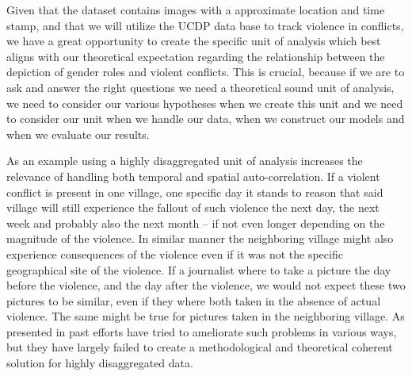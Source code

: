 \documentclass[a4paper]{article}
\begin{document}
Given that the dataset contains images with a approximate location and time stamp, and that we will utilize the UCDP data base to track violence in conflicts, we have a great opportunity to create the specific unit of analysis which best aligns with our theoretical expectation regarding the relationship between the depiction of gender roles and violent conflicts. This is crucial, because if we are to ask and answer the right questions we need a theoretical sound unit of analysis, we need to consider our various hypotheses when we create this unit and we need to consider our unit when we handle our data, when we construct our models and when we evaluate our results.\par 

As an example using a highly disaggregated unit of analysis increases the relevance of handling both temporal and spatial auto-correlation. If a violent conflict is present in one village, one specific day it stands to reason that said village will still experience the fallout of such violence the next day, the next week and probably also the next month -- if not even longer depending on the magnitude of the violence. In similar manner the neighboring village might also experience consequences of the violence even if it was not the specific geographical site of the violence. If a journalist where to take a picture the day before the violence, and the day after the violence, we would not expect these two pictures to be similar, even if they where both taken in the absence of actual violence. The same might be true for pictures taken in the neighboring village. As presented in \cite{SPECIALE} past efforts have tried to ameliorate such problems in various ways, but they have largely failed to create a methodological and theoretical coherent solution for highly disaggregated data.\par 
\end{document}
